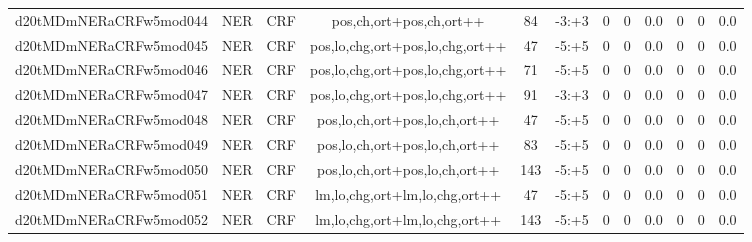 \documentclass[a4paper]{article}
\begin{document}
\begin{landscape}
\begin{center}
\begin{tabular}{ |c|c|c|c|c|c|c|c|c|c|c|c|}
 
 	
 	\small{ d20tMDmNERaCRFw5mod044 } & \small{ NER} & \small{  CRF }  & pos,ch,ort+pos,ch,ort++  &  84 &  \small{  -3:+3 }  &  0 & 0 & 0.0  &  0 & 0 & 0.0 \\
 	

 
 	
 	\small{ d20tMDmNERaCRFw5mod045 } & \small{ NER} & \small{  CRF }  & pos,lo,chg,ort+pos,lo,chg,ort++  &  47 &  \small{  -5:+5 }  &  0 & 0 & 0.0  &  0 & 0 & 0.0 \\
 	

 
 	
 	\small{ d20tMDmNERaCRFw5mod046 } & \small{ NER} & \small{  CRF }  & pos,lo,chg,ort+pos,lo,chg,ort++  &  71 &  \small{  -5:+5 }  &  0 & 0 & 0.0  &  0 & 0 & 0.0 \\
 	

 
 	
 	\small{ d20tMDmNERaCRFw5mod047 } & \small{ NER} & \small{  CRF }  & pos,lo,chg,ort+pos,lo,chg,ort++  &  91 &  \small{  -3:+3 }  &  0 & 0 & 0.0  &  0 & 0 & 0.0 \\
 	

 
 	
 	\small{ d20tMDmNERaCRFw5mod048 } & \small{ NER} & \small{  CRF }  & pos,lo,ch,ort+pos,lo,ch,ort++  &  47 &  \small{  -5:+5 }  &  0 & 0 & 0.0  &  0 & 0 & 0.0 \\
 	

 
 	
 	\small{ d20tMDmNERaCRFw5mod049 } & \small{ NER} & \small{  CRF }  & pos,lo,ch,ort+pos,lo,ch,ort++  &  83 &  \small{  -5:+5 }  &  0 & 0 & 0.0  &  0 & 0 & 0.0 \\
 	

 
 	
 	\small{ d20tMDmNERaCRFw5mod050 } & \small{ NER} & \small{  CRF }  & pos,lo,ch,ort+pos,lo,ch,ort++  &  143 &  \small{  -5:+5 }  &  0 & 0 & 0.0  &  0 & 0 & 0.0 \\
 	

 
 	
 	\small{ d20tMDmNERaCRFw5mod051 } & \small{ NER} & \small{  CRF }  & lm,lo,chg,ort+lm,lo,chg,ort++  &  47 &  \small{  -5:+5 }  &  0 & 0 & 0.0  &  0 & 0 & 0.0 \\
 	

 
 	
 	\small{ d20tMDmNERaCRFw5mod052 } & \small{ NER} & \small{  CRF }  & lm,lo,chg,ort+lm,lo,chg,ort++  &  143 &  \small{  -5:+5 }  &  0 & 0 & 0.0  &  0 & 0 & 0.0 \\
 	


\end{tabular}
\end{center}
\end{landscape}
\end{document}
